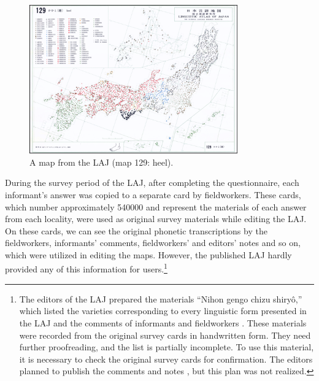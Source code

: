 \documentclass[output=paper]{LSP/langsci}
\begin{document}
\begin{figure} 
\includegraphics[width=0.8\textwidth]{illustrations/kuma_fig01}
\caption{A map from the LAJ (map 129: heel).}          
\label{fig:kuma:1}
\end{figure}  

\largerpage[-3]
During the survey period of the LAJ, after completing the questionnaire, each informant’s answer was copied to a separate card by fieldworkers. These cards, which number approximately 540000 \citep[38, 43]{kokuritsu_kokugo_kenkyujo_nlri_nihon_1966} and represent the materials of each answer from each locality, were used as original survey materials while editing the LAJ. On these cards, we can see the original phonetic transcriptions by the fieldworkers, informants’ comments, fieldworkers’ and editors’ notes and so on, which were utilized in editing the maps. However, the published LAJ hardly provided any of this information for users.\footnote{The editors of the LAJ prepared the materials “Nihon gengo chizu shiryô,” which listed the varieties corresponding to every linguistic form presented in the LAJ and the comments of informants and fieldworkers \citep[32, 33]{kokuritsu_kokugo_kenkyujo_nlri_nihon_1966}. These materials were recorded from the original survey cards in handwritten form. They need further proofreading, and the list is partially incomplete. To use this material, it is necessary to check the original survey cards for confirmation. The editors planned to publish the comments and notes \citep[44]{kokuritsu_kokugo_kenkyujo_nlri_nihon_1966}, but this plan was not realized.}
\end{document}
